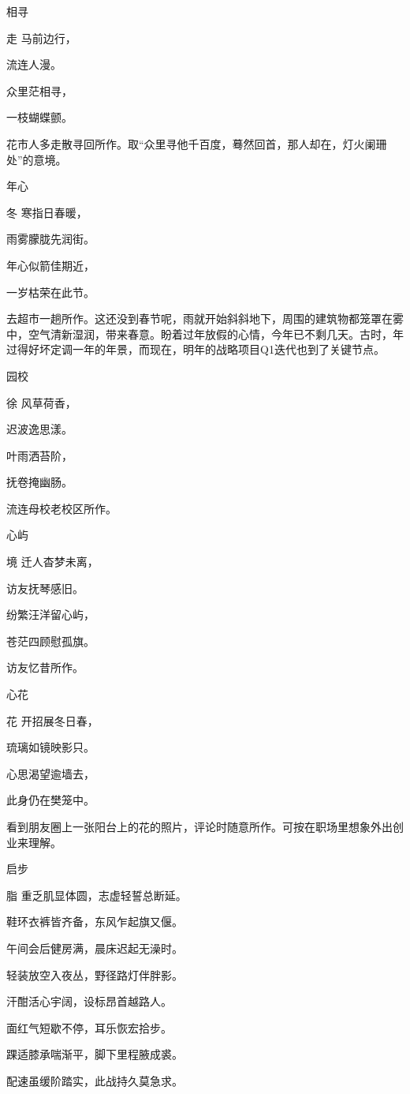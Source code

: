 \documentclass{article}
\newenvironment{poem}[3]{
\begin{minipage}{\textwidth}
\begin{pinyinscope}\begin{center}\Large\linespread{1.4}\selectfont #2\end{center}\end{pinyinscope}
\begin{pinyinscope}
	\begin{center}
	\Large\linespread{1.4}\rmfamily\selectfont #3
}{\end{center}
\end{pinyinscope}
\end{minipage}
}
\begin{document}
\begin{poem}{}{相寻}
走马前边行，

流连人{}漫。

众里茫相寻，

一枝蝴蝶颤。
\end{poem}

花市人多走散寻回所作。取“众里寻他千百度，蓦然回首，那人却在，灯火阑珊处”的意境。

\begin{poem}{}{年心}
冬寒指日{}春暖，

雨雾朦胧先润街。

年心似箭佳期近，

一岁枯荣在此节。
\end{poem}

去超市一趟所作。这还没到春节呢，雨就开始斜斜地下，周围的建筑物都笼罩在雾中，空气清新湿润，带来春意。盼着过年放假的心情，今年已不剩几天。古时，年过得好坏定调一年的年景，而现在，明年的战略项目Q1迭代也到了关键节点。

\begin{poem}{}{园校}
徐风草荷香，

迟波逸思漾。

叶雨洒苔阶，

抚卷掩幽肠。
\end{poem}

流连母校老校区所作。

\begin{poem}{}{心屿}
境迁人杳梦未离，

访友抚琴感旧{}。

纷繁汪洋留心屿，

苍茫四顾慰孤旗。
\end{poem}

访友忆昔所作。

\begin{poem}{}{心花}
花开招展冬日春，

琉璃如镜映影只。

心思渴望逾墙去，

此身仍在樊笼中。
\end{poem}

看到朋友圈上一张阳台上的花的照片，评论时随意所作。可按在职场里想象外出创业来理解。

\begin{poem}{}{启步}
脂重乏肌显体圆，志虚轻誓总断延。

鞋环衣裤皆齐备，东风乍起旗又偃。

午间会后健房满，晨床迟起无澡时。

轻装放空入夜丛，野径路灯伴胖影。

汗酣{}活心宇阔，设标昂首越路人。

面红气短歇不停，耳乐恢宏{}拾步。

踝适膝承喘渐平，脚下里程腋成裘。

配速虽缓阶踏实，此战持久莫急求。
\end{poem}
\end{document}
